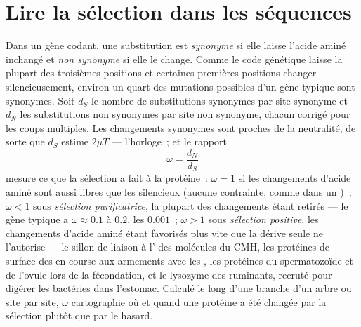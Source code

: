 \section{Lire la sélection dans les séquences}

\begin{definition}[Le rapport dN/dS]\label{def:b3:molecular-evolution:dnds}
Dans un gène codant, une substitution est \emph{synonyme} si elle laisse
l'acide aminé inchangé et \emph{non synonyme} si elle le change. Comme
le code génétique laisse la plupart des troisièmes positions et
certaines premières positions changer silencieusement, environ un quart
des mutations possibles d'un gène typique sont synonymes. Soit $d_{S}$
le nombre de substitutions synonymes par site synonyme et $d_{N}$ les
substitutions non synonymes par site non synonyme, chacun corrigé pour
les coups multiples. Les changements synonymes sont proches de la
neutralité, de sorte que $d_{S}$ estime $2\mu T$ --- l'horloge~; et le
rapport
\[
\omega = \frac{d_{N}}{d_{S}}
\]
mesure ce que la sélection a fait à la protéine~: $\omega = 1$ si les
changements d'acide aminé sont aussi libres que les silencieux (aucune
contrainte, comme dans un )~; $\omega < 1$ sous
\emph{sélection purificatrice}, la plupart des changements étant retirés
--- le gène typique a $\omega \approx 0.1$ à $0.2$, les  $0.001$~;
$\omega > 1$ sous \emph{sélection positive}, les changements d'acide
aminé étant favorisés plus vite que la dérive seule ne l'autorise --- le
sillon de liaison à l' des molécules du CMH, les protéines de
surface des  en course aux armements avec les , les
protéines du spermatozoïde et de l'ovule lors de la fécondation, et le
lysozyme des ruminants, recruté pour digérer les bactéries dans
l'estomac. Calculé le long d'une branche d'un arbre ou site par site,
$\omega$ cartographie où et quand une protéine a été changée par la
sélection plutôt que par le hasard.
\end{definition}

